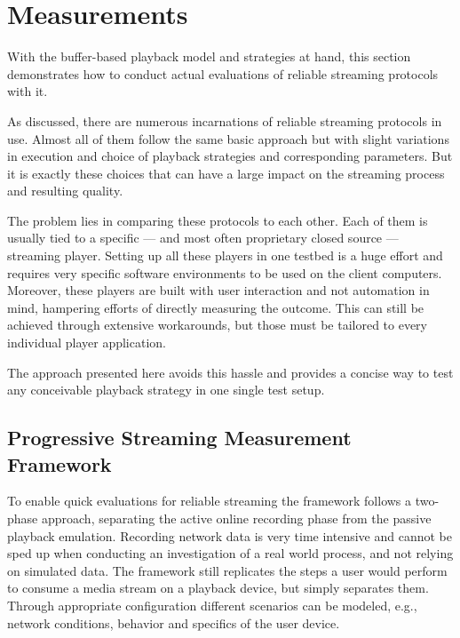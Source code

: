 \section{Measurements}
\label{c3:sec:measurements}

With the buffer-based playback model and strategies at hand, this section demonstrates how to conduct actual evaluations of reliable streaming protocols with it.

As discussed, there are numerous incarnations of reliable streaming protocols in use. Almost all of them follow the same basic approach but with slight variations in execution and choice of playback strategies and corresponding parameters. But it is exactly these choices that can have a large impact on the streaming process and resulting quality. 

The problem lies in comparing these protocols to each other. Each of them is usually tied to a specific --- and most often proprietary closed source --- streaming player. Setting up all these players in one testbed is a huge effort and requires very specific software environments to be used on the client computers. Moreover, these players are built with user interaction and not automation in mind, hampering efforts of directly measuring the outcome. This can still be achieved through extensive workarounds, but those must be tailored to every individual player application. 

The approach presented here avoids this hassle and provides a concise way to test any conceivable playback strategy in one single test setup.


\subsection{Progressive Streaming Measurement Framework}

To enable quick evaluations for reliable streaming the framework follows a two-phase approach, separating the active online recording phase from the passive playback emulation. Recording network data is very time intensive and cannot be sped up when conducting an investigation of a real world process, and not relying on simulated data. The framework still replicates the steps a user would perform to consume a media stream on a playback device, but simply separates them. Through appropriate configuration different scenarios can be modeled, e.g., network conditions, behavior and specifics of the user device.
 

